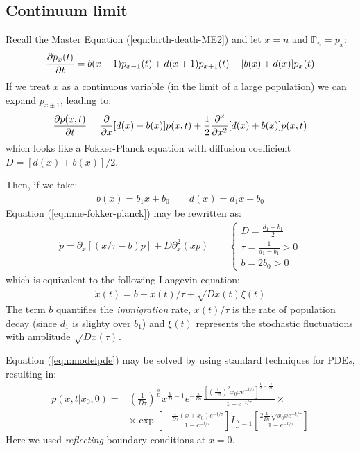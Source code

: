 \documentclass[../../main.tex]{subfiles}
\begin{document}
\subsection{Continuum limit}\label{sec:birth-death-continuum}
Recall the Master Equation (\ref{eqn:birth-death-ME2}) and let $x = n$ and $\mathbb{P}_n = p_x$:
\begin{align*}
    \pdv{p_x(t)}{t}=b(x-1) p_{x-1}(t)+d(x+1) p_{x+1}(t)-[b(x)+d(x)] p_{x}(t)
\end{align*}
If we treat $x$ as a continuous variable (in the limit of a large population) we can expand $p_{x\pm1}$, leading to:
\begin{align}\label{eqn:me-fokker-planck}
    \pdv{p(x,t)}{t} = \pdv{x} [d(x) - b(x)] p(x,t) + \frac{1}{2} \pdv[2]{x} [d(x) + b(x)] p(x,t) 
\end{align}
which looks like a Fokker-Planck equation with diffusion coefficient $D = [d(x) + b(x)]/2$.

Then, if we take:
\begin{align*}
    b(x) = b_1 x + b_0\qquad d(x) = d_1 x - b_0
\end{align*}
Equation (\ref{eqn:me-fokker-planck}) may be rewritten as:
\begin{align}\label{eqn:modelpde}
    \dot{p} = \partial_x[(x/\tau - b)p] + D\partial_x^2 (xp) \qquad \begin{cases}
        D = \frac{d_1 + b_1}{2}\\
        \tau = \frac{1}{d_1 - b_1} > 0\\
        b = 2b_0 > 0  
    \end{cases}
\end{align}
which is equivalent to the following Langevin equation:
\begin{align*}
    \dot{x}(t) = b - x(t)/\tau + \sqrt{D x(t)} \xi(t)
\end{align*}
The term $b$ quantifies the \textit{immigration} rate, $x(t)/\tau$ is the rate of population decay (since $d_1$ is slighty over $b_1$) and $\xi(t)$ represents the stochastic fluctuations with amplitude $\sqrt{D x(\tau)}$.

\medskip

Equation (\ref{eqn:modelpde}) may be solved by using standard techniques for PDE\textit{s}, resulting in:
\begin{align*}
    p(x, t | x_{0}, 0) = &\left(\frac{1}{D \tau}\right)^{\frac{b}{D}} x^{\frac{b}{D}-1} e^{-\frac{x}{D \tau}} \frac{\left[\left(\frac{1}{D \tau}\right)^{2} x_{0} x e^{-t / \tau}\right]^{\frac{1}{2}-\frac{b}{2 D}}}{1-e^{-t / \tau}} \times \\
    & \times \exp \left[-\frac{\frac{1}{D \tau}\left(x+x_{0}\right) e^{-t / \tau}}{1-e^{-t / \tau}}\right] I_{\frac{b}{D}-1}\left[\frac{2 \frac{1}{D \tau} \sqrt{x_{0} x e^{-t / \tau}}}{1-e^{-t / \tau}}\right]
\end{align*}
Here we used \textit{reflecting} boundary conditions at $x=0$.
\end{document}
